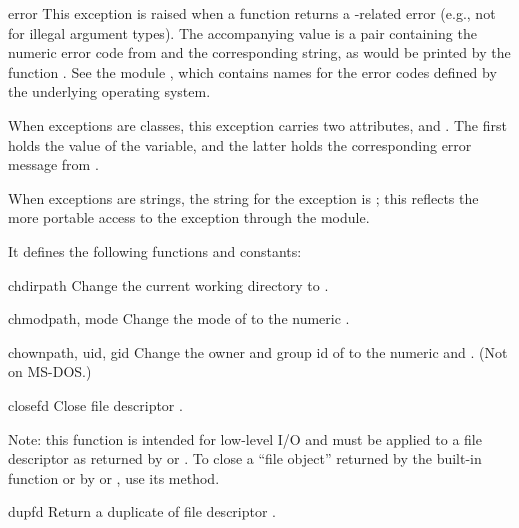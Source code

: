 \begin{excdesc}{error}
This exception is raised when a \POSIX{} function returns a
\POSIX{}-related error (e.g., not for illegal argument types).  The
accompanying value is a pair containing the numeric error code from
 and the corresponding string, as would be printed by the
\C{} function .  See the module
, which contains names for the
error codes defined by the underlying operating system.

When exceptions are classes, this exception carries two attributes,
 and .  The first holds the value of
the \C{}  variable, and the latter holds the
corresponding error message from .

When exceptions are strings, the string for the exception is
; this reflects the more portable access to the
exception through the  module.
\end{excdesc}

It defines the following functions and constants:

\begin{funcdesc}{chdir}{path}
Change the current working directory to .
\end{funcdesc}

\begin{funcdesc}{chmod}{path, mode}
Change the mode of  to the numeric .
\end{funcdesc}

\begin{funcdesc}{chown}{path, uid, gid}
Change the owner and group id of  to the numeric 
and .
(Not on MS-DOS.)
\end{funcdesc}

\begin{funcdesc}{close}{fd}
Close file descriptor .

Note: this function is intended for low-level I/O and must be applied
to a file descriptor as returned by  or
.  To close a ``file object'' returned by the
built-in function  or by  or
, use its  method.
\end{funcdesc}

\begin{funcdesc}{dup}{fd}
Return a duplicate of file descriptor .
\end{funcdesc}

